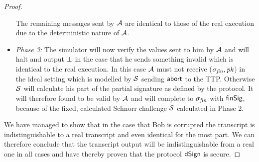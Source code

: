 \begin{proof}
\begin{itemize}
        The remaining messages sent by $\mathcal{A}$ are identical to those of the real execution due to the deterministic nature of $\mathcal{A}$.
        \item \textit{Phase 3: } The simulator will now verify the values sent to him by $\mathcal{A}$ and will halt and output $\bot$ in the case that he sends something invalid which is identical to the real execution.
        In this case $\mathcal{A}$ must not receive ($\sigma_{\mathit{fin}}, \mathit{pk}$) in the ideal setting which is modelled by $\mathcal{S}$ sending $\mathsf{abort}$ to the TTP.
        Otherwise $\mathcal{S}$ will calculate his part of the partial signature as defined by the protocol.
        It will therefore found to be valid by $\mathcal{A}$ and will complete to $\sigma_{\mathit{fin}}$ with $\mathsf{finSig}$, because of the fixed, calculated Schnorr challenge $\mathcal{S}$ calculated in Phase 2.
    \end{itemize}

    We have managed to show that in the case that Bob is corrupted the transcript is indistinguishable to a real transcript and even identical for the most part.
    We can therefore conclude that the transcript output will be indistinguishable from a real one in all cases and have thereby proven that the protocol $\mathsf{dSign}$ is secure.
\end{proof}

